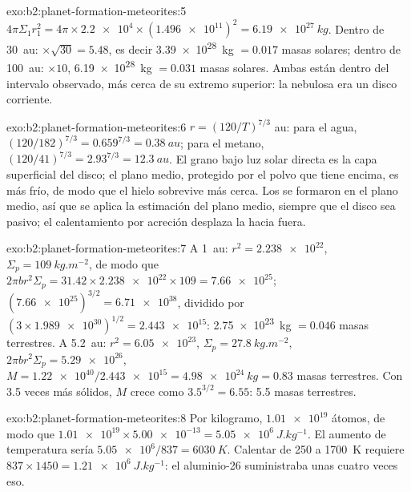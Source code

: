 \begin{solution}{exo:b2:planet-formation-meteorites:5}
$4\pi\Sigma_1 r_1^2 = 4\pi\times\num{2.2e4}\times(\num{1.496e11})^2 =
\qty{6.19e27}{kg}$. Dentro de \qty{30}{au}: $\times\sqrt{30} = 5.48$, es decir
\qty{3.39e28}{kg} $= 0.017$ masas solares; dentro de \qty{100}{au}: $\times10$,
\qty{6.19e28}{kg} $= 0.031$ masas solares. Ambas están dentro del intervalo observado,
más cerca de su extremo superior: la nebulosa era un disco corriente.
\end{solution}

\begin{solution}{exo:b2:planet-formation-meteorites:6}
$r = (120/T)^{7/3}$ au: para el agua, $(120/182)^{7/3} = 0.659^{7/3} =
\qty{0.38}{au}$; para el metano, $(120/41)^{7/3} = 2.93^{7/3} = \qty{12.3}{au}$.
El grano bajo luz solar directa es la capa superficial del disco; el plano medio,
protegido por el polvo que tiene encima, es más frío, de modo que el hielo sobrevive más cerca. Los
 se formaron en el plano medio, así que se aplica la estimación del plano medio, siempre que
el disco sea pasivo; el calentamiento por acreción desplaza la  hacia fuera.
\end{solution}

\begin{solution}{exo:b2:planet-formation-meteorites:7}
A \qty{1}{au}: $r^2 = \num{2.238e22}$, $\Sigma_p = \qty{109}{kg.m^{-2}}$, de modo que
$2\pi b r^2\Sigma_p = 31.42\times\num{2.238e22}\times109 = \num{7.66e25}$;
$(\num{7.66e25})^{3/2} = \num{6.71e38}$, dividido por
$(3\times\num{1.989e30})^{1/2} = \num{2.443e15}$: \qty{2.75e23}{kg}
$= 0.046$ masas terrestres. A \qty{5.2}{au}: $r^2 = \num{6.05e23}$,
$\Sigma_p = \qty{27.8}{kg.m^{-2}}$, $2\pi b r^2\Sigma_p = \num{5.29e26}$,
$M = \num{1.22e40}/\num{2.443e15} = \qty{4.98e24}{kg} = 0.83$ masas terrestres.
Con \num{3.5} veces más sólidos, $M$ crece como $3.5^{3/2} = 6.55$: 5.5 masas
terrestres.
\end{solution}

\begin{solution}{exo:b2:planet-formation-meteorites:8}
Por kilogramo, $\num{1.01e19}$ átomos, de modo que
$\num{1.01e19}\times\num{5.00e-13} = \qty{5.05e6}{J.kg^{-1}}$. El aumento de
temperatura sería $\num{5.05e6}/837 = \qty{6030}{K}$. Calentar de \num{250} a
\qty{1700}{K} requiere $837\times1450 = \qty{1.21e6}{J.kg^{-1}}$: el aluminio-26
suministraba unas cuatro veces eso.
\end{solution}

